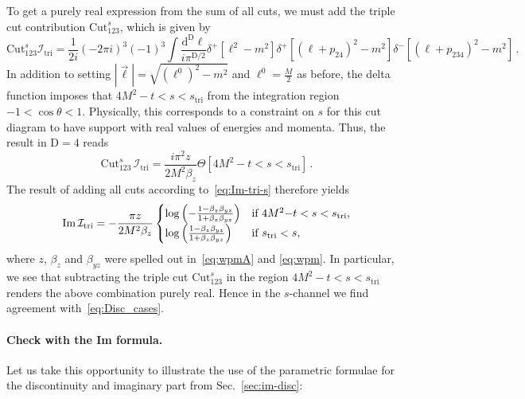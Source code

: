 \documentclass[12pt]{article}
\numberwithin{figure}{section}
\def \D {\mathrm{D}}
\def \d {\mathrm{d}}
\def \I {\mathcal{I}}
\def \Im {\mathrm{Im}}
\def \triangle {\mathrm{tri}}
\def \Cut {\mathrm{Cut}}
\begin{document}
    To get a purely real expression from the sum of all cuts, we must add the triple cut contribution $\Cut_{123}^s$, which is given by
    \begin{equation}
        \Cut_{123}^s \I_{\triangle} = \frac{1}{2i} \left(-2\pi i \right)^3 (-1)^3 \!\!\int\! \frac{\d^\D \ell}{i \pi^{\D/2}}  \delta^+[\ell^2-m^2] \delta^+[(\ell+p_{24})^2-m^2] \delta^-[(\ell + p_{234})^2-m^2] \,.
    \end{equation}
    In addition to setting $|\vec{\ell}| = \sqrt{(\ell^0)^2-m^2}$ and $\ell^0=\frac{M}{2}$ as before, the delta function imposes that $4 M^2-t < s < s_{\triangle}$ from the integration region $-1<\cos \theta <1$. Physically, this corresponds to a constraint on $s$ for this cut diagram to have support with real values of energies and momenta.
    Thus, the result in $\D=4$ reads
    \begin{equation}
        \Cut_{123}^s\, \I_{\triangle} = 
        \frac{i \pi^2 z}{2 M^2 \beta_z} \Theta[4 M^2-t<s<s_{\triangle}]\,.
    \end{equation}
    The result of adding all cuts according to~\eqref{eq:Im-tri-s} therefore yields
    \begin{equation}\label{eq:Im-Itri}
        \Im\, \I_{\triangle}  = -\frac{\pi z}{2 M^2 \beta_z}
        \begin{cases}
        \log \left(-
        \frac{1-\beta_z \beta_{yz}}{1+\beta_z \beta_{yz}}
        \right) \hfill & \text{if } 4M^2{-}t < s < s_{\triangle},\\
        \log \left(
        \frac{1-\beta_z \beta_{yz}}{1+\beta_z \beta_{yz}}
        \right) \hfill & \text{if }  s_\triangle < s,
        \end{cases}
    \end{equation}
    where $z$, $\beta_z$ and $\beta_{yz}$ were spelled out in~\eqref{eq:wpmA} and \eqref{eq:wpm}.
    In particular, we see that subtracting the triple cut $\Cut_{123}^s$ in the region $4M^2 - t < s < s_{\triangle}$ renders the above combination purely real. 
    Hence in the $s$-channel we find agreement with~\eqref{eq:Disc_cases}.
    
    \paragraph{Check with the Im formula.}
    Let us take this opportunity to illustrate the use of the parametric formulae for the discontinuity and imaginary part from Sec.~\ref{sec:im-disc}:
    
\end{document}
